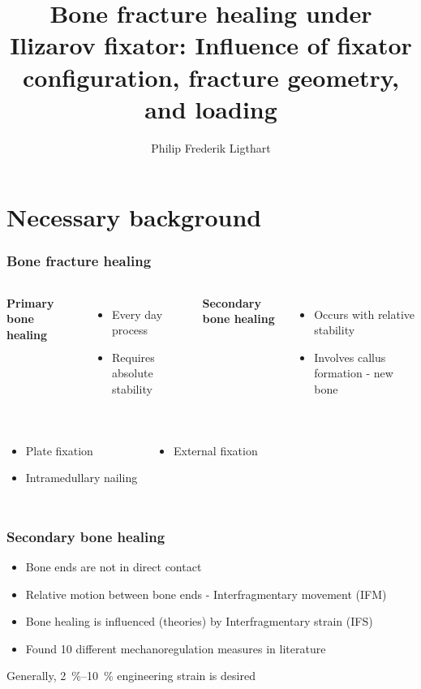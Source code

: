\documentclass[aspectratio=169,xcolor={svgnames,table},10pt,fleqn]{beamer}
\title[\footnotesize Journal Club]
      {\Large Bone fracture healing under Ilizarov fixator: Influence of fixator configuration, fracture geometry, and loading}
\author{Philip Frederik Ligthart}
\institute{\itshape Dept of Mech \& Mechatronic Eng,\\
           Stellenbosch University, South Africa}
\date{}
\begin{document}
\begin{frame}
  \maketitle
\end{frame}

\section{Necessary background}

  \begin{frame}
    \frametitle{Bone fracture healing}
    \begin{columns}
      \textbf{Primary bone healing}
      \begin{itemize}
        \item Every day process
        \item Requires absolute stability
      \end{itemize}
      \textbf{Secondary bone healing}
      \begin{itemize}
        \item Occurs with relative stability
        \item Involves callus formation - new bone
      \end{itemize}
    \end{columns}
    \vspace{1cm}
    \begin{columns}
      \begin{itemize}
        \item Plate fixation
        \item Intramedullary nailing
      \end{itemize}
      \begin{itemize}
        \item External fixation
      \end{itemize}
    \end{columns}
  \end{frame}

  \begin{frame}
    \frametitle{Secondary bone healing}
    \begin{itemize}
      \item Bone ends are not in direct contact
      \item Relative motion between bone ends - Interfragmentary movement (IFM)
      \item Bone healing is influenced (theories) by Interfragmentary strain (IFS)
      \vspace{1cm}
      \item Found 10 different mechanoregulation measures in literature
    \end{itemize}
    \vspace{1cm}
    Generally, \qtyrange[range-phrase = --, range-units = single]{2}{10}{\percent} engineering strain is desired
  \end{frame}
\end{document}
